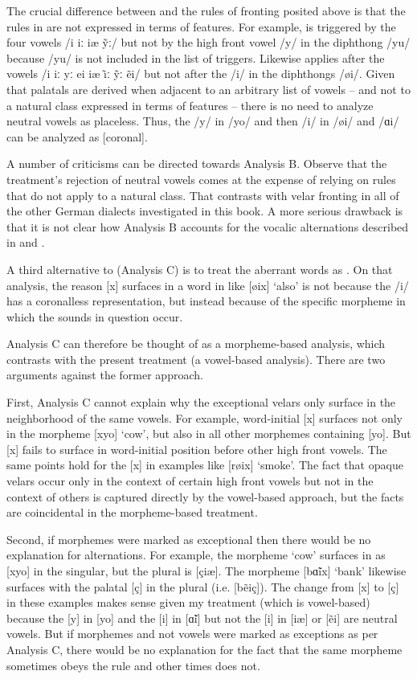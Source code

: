 The crucial difference between  and the rules of fronting posited above is that the rules in  are not expressed in terms of features. For example,  is triggered by the four vowels /i iː iæ ỹː/ but not by the high front vowel /y/ in the diphthong /yu/ because /yu/ is not included in the list of triggers. Likewise  applies after the vowels /i iː yː ei iæ {\~\i}ː ỹː ẽi/ but not after the /i/ in the diphthongs /øi/. Given that palatals are derived when adjacent to an arbitrary list of vowels -- and not to a natural class expressed in terms of features -- there is no need to analyze neutral vowels as placeless. Thus, the /y/ in /yo/ and then /i/ in /øi/ and /ɑi/ can be analyzed as [coronal].

A number of criticisms can be directed towards Analysis B. Observe that the treatment’s rejection of neutral vowels comes at the expense of relying on rules that do not apply to a natural class. That contrasts with velar fronting in all of the other German dialects investigated in this book. A more serious drawback is that it is not clear how Analysis B accounts for the vocalic alternations described in  and .

A third alternative to  (Analysis C) is to treat the aberrant words as . On that analysis, the reason [x] surfaces in a word in  like [øix] ‘also’ is not because the /i/ has a coronalless representation, but instead because of the specific morpheme in which the sounds in question occur.

Analysis C can therefore be thought of as a morpheme-based analysis, which contrasts with the present treatment (a vowel-based analysis). There are two arguments against the former approach.

First, Analysis C cannot explain why the exceptional velars only surface in the neighborhood of the same vowels. For example, word-initial [x] surfaces not only in the morpheme [xyo] ‘cow’, but also in all other morphemes containing [yo]. But [x] fails to surface in word-initial position before other high front vowels. The same points hold for the [x] in  examples like [røix] ‘smoke’. The fact that opaque velars occur only in the context of certain high front vowels but not in the context of others is captured directly by the vowel-based approach, but the facts are coincidental in the morpheme-based treatment.

Second,  if morphemes were marked as exceptional then there would be no explanation for  alternations. For example, the morpheme ‘cow’ surfaces in  as [xyo] in the singular, but the plural is [çiæ]. The morpheme [b\~ɑix] ‘bank’ likewise surfaces with the palatal [ç] in the plural (i.e. [bẽiç]). The change from [x] to [ç] in these examples makes sense given my treatment (which is vowel-based) because the [y] in [yo] and the [i] in [\~ɑi] but not the [i] in [iæ] or [ẽi] are neutral vowels. But if morphemes and not vowels were marked as exceptions as per Analysis C, there would be no explanation for the fact that the same morpheme sometimes obeys the rule and other times does not.

